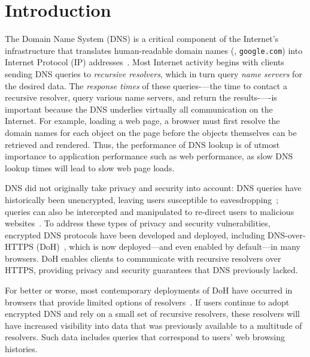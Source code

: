 \section{Introduction}\label{sec:intro}

The Domain Name System (DNS) is a critical component of the Internet's
infrastructure that translates human-readable domain names (\eg,
\texttt{google.com}) into Internet Protocol (IP) addresses~\cite{dns-rfcs}.
Most Internet activity begins with clients sending DNS queries to
\emph{recursive resolvers}, which in turn query \emph{name servers} for the
desired data.  The \emph{response times} of these queries-—the time 
to contact a recursive resolver, query various name servers, and return
the results-—-is important because the DNS underlies virtually all
communication on the Internet.  For example, loading a
web page, a browser must first resolve the domain names for each object on the
page before the objects themselves can be retrieved and rendered.  Thus, the
performance of DNS lookup is of utmost importance to application performance
such as web performance, as slow DNS lookup times will lead to slow web page
loads.

DNS did not originally take privacy and security into account: DNS queries
have historically been unencrypted, leaving users susceptible to
eavesdropping~\cite{dns-eavesdrop}; queries can also be intercepted and
manipulated to re-direct users to malicious websites~\cite{dns-redirect}.  To
address these types of privacy and security vulnerabilities, encrypted DNS
protocols have been developed and deployed, including DNS-over-HTTPS
(DoH)~\cite{rfc8484}, which is now deployed---and even enabled by default---in
many browsers.  DoH enables clients to communicate with recursive resolvers
over HTTPS, providing privacy and security guarantees that DNS previously
lacked.

For better or worse, most contemporary deployments of DoH have occurred in
browsers that provide limited options of
resolvers~\cite{ffChoices,chromeResolvers}.  If users continue to adopt
encrypted DNS and rely on a small set of recursive resolvers, these resolvers
will have increased visibility into data that was previously available to a
multitude of resolvers.  Such data includes queries that correspond to users'
web browsing histories.

